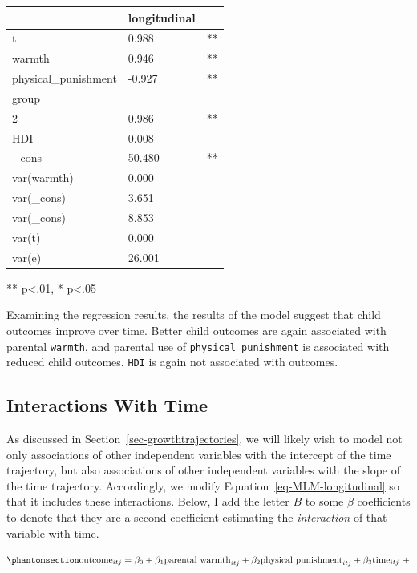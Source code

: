 \documentclass[
  letterpaper,
  DIV=11,
  numbers=noendperiod]{scrreprt}
\begin{document}
\begin{longtable}[]{@{}lll@{}}
\toprule\noalign{}
& longitudinal & \\
\midrule\noalign{}
\endhead
\bottomrule\noalign{}
\endlastfoot
t & 0.988 & ** \\
warmth & 0.946 & ** \\
physical\_punishment & -0.927 & ** \\
group & & \\
2 & 0.986 & ** \\
HDI & 0.008 & \\
\_cons & 50.480 & ** \\
var(warmth) & 0.000 & \\
var(\_cons) & 3.651 & \\
var(\_cons) & 8.853 & \\
var(t) & 0.000 & \\
var(e) & 26.001 & \\
\end{longtable}

** p\textless.01, * p\textless.05

Examining the regression results, the results of the model suggest that
child outcomes improve over time. Better child outcomes are again
associated with parental \texttt{warmth}, and parental use of
\texttt{physical\_punishment} is associated with reduced child outcomes.
\texttt{HDI} is again not associated with outcomes.

\subsection{Interactions With Time}\label{interactions-with-time}

As discussed in Section~\ref{sec-growthtrajectories}, we will likely
wish to model not only associations of other independent variables with
the intercept of the time trajectory, but also associations of other
independent variables with the slope of the time trajectory.
Accordingly, we modify Equation~\ref{eq-MLM-longitudinal} so that it
includes these interactions. Below, I add the letter \(B\) to some
\(\beta\) coefficients to denote that they are a second coefficient
estimating the \emph{interaction} of that variable with time.

\begin{equation}\phantomsection\label{eq-MLM-longitudinal}{\text{outcome}_{itj} = \beta_0 + \beta_1 \text{parental warmth}_{itj} + \beta_2 \text{physical punishment}_{itj} + \beta_3 \text{time}_{itj} \ + }\end{equation}
\end{document}
